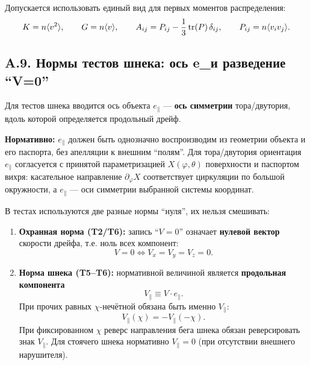 \begin{remark}
Допускается использовать единый вид для первых моментов распределения:
\[
K=n\langle v^2\rangle,\qquad G=n\langle v\rangle,\qquad
A_{ij}=P_{ij}-\frac{1}{3}\tr(P)\,\delta_{ij},\qquad P_{ij}=n\langle v_i v_j\rangle.
\]
\end{remark}

\subsection{A.9. Нормы тестов шнека: ось e\_\parallel и разведение ``V=0''}

\begin{postulate}
Для тестов шнека вводится ось объекта \(e_{\parallel}\) — \textbf{ось симметрии} тора/двутория,
вдоль которой определяется продольный дрейф.

\textbf{Нормативно:} \(e_{\parallel}\) должен быть однозначно воспроизводим из геометрии объекта и его паспорта,
без апелляции к внешним ``полям''.
Для тора/двутория ориентация \(e_{\parallel}\) согласуется с принятой параметризацией \(X(\varphi,\theta)\) поверхности и паспортом вихря:
касательное направление \(\partial_{\varphi}X\) соответствует циркуляции по большой окружности, а \(e_{\parallel}\) — оси симметрии выбранной системы координат.
\end{postulate}

\begin{postulate}[Разведение норм ``\(V=0\)'' и нормы по \(V_{\parallel}\)]
В тестах используются две разные нормы ``нуля'', их нельзя смешивать:
\begin{enumerate}
\item \textbf{Охранная норма (T2/T6):} запись ``\(V=0\)'' означает \textbf{нулевой вектор} скорости дрейфа,
т.е. ноль всех компонент:
\[
V=0 \iff V_x=V_y=V_z=0.
\]
\item \textbf{Норма шнека (T5--T6):} нормативной величиной является \textbf{продольная компонента}
\[
V_{\parallel}\equiv V\cdot e_{\parallel}.
\]
При прочих равных \(\chi\)-нечётной обязана быть именно \(V_{\parallel}\):
\[
V_{\parallel}(\chi)=-V_{\parallel}(-\chi).
\]
При фиксированном \(\chi\) реверс направления бега шнека обязан реверсировать знак \(V_{\parallel}\).
Для стоячего шнека нормативно \(V_{\parallel}=0\) (при отсутствии внешнего нарушителя).
\end{enumerate}
\end{postulate}

